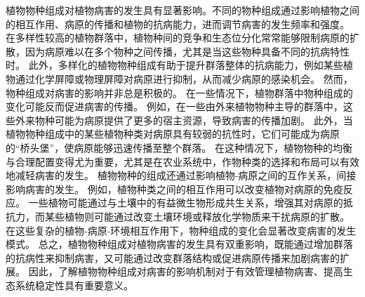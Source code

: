 \documentclass[AutoFakeBold]{LZUThesis-PgD&PhD}
\begin{document}
植物物种组成对植物病害的发生具有显著影响。不同的物种组成通过影响植物之间的相互作用、病原的传播和植物的抗病能力，进而调节病害的发生频率和强度。
在多样性较高的植物群落中，植物种间的竞争和生态位分化常常能够限制病原的扩散，因为病原难以在多个物种之间传播，尤其是当这些物种具备不同的抗病特性时\cite{Mitchell2002}。
此外，多样化的植物物种组成有助于提升群落整体的抗病能力，例如某些植物通过化学屏障或物理屏障对病原进行抑制，从而减少病原的感染机会。
然而，物种组成对病害的影响并非总是积极的。
在一些情况下，植物群落中物种组成的变化可能反而促进病害的传播。
例如，在一些由外来植物物种主导的群落中，这些外来物种可能为病原提供了更多的宿主资源，导致病害的传播加剧\cite{Garrett2006}。
此外，当植物物种组成中的某些植物种类对病原具有较弱的抗性时，它们可能成为病原的“桥头堡”，使病原能够迅速传播至整个群落。
在这种情况下，植物物种的均衡与合理配置变得尤为重要，尤其是在农业系统中，作物种类的选择和布局可以有效地减轻病害的发生。
植物物种的组成还通过影响植物-病原之间的互作关系，间接影响病害的发生。
例如，植物种类之间的相互作用可以改变植物对病原的免疫反应。
一些植物可能通过与土壤中的有益微生物形成共生关系，增强其对病原的抵抗力，而某些植物则可能通过改变土壤环境或释放化学物质来干扰病原的扩散\cite{Bever2010}。
在这些复杂的植物-病原-环境相互作用下，物种组成的变化会显著改变病害的发生模式。
总之，植物物种组成对植物病害的发生具有双重影响，既能通过增加群落的抗病性来抑制病害，又可能通过改变群落结构或促进病原传播来加剧病害的扩展。
因此，了解植物物种组成对病害的影响机制对于有效管理植物病害、提高生态系统稳定性具有重要意义\cite{Pautasso2010,Maron2011}。
\end{document}
